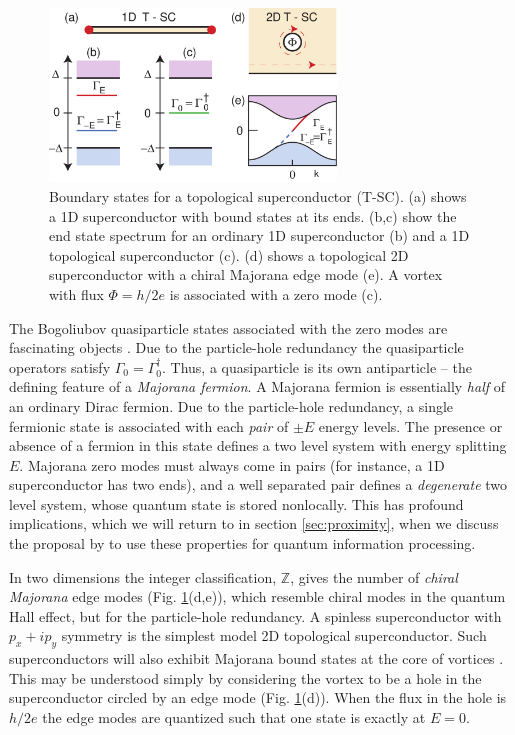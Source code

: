 \documentclass[twocolumn,floatfix,showpacs,rmp,aps]{revtex4}
\begin{document}
	\begin{figure}
		\includegraphics[width=3in]{Fig4}
		\caption{Boundary states for a topological superconductor (T-SC).  (a) shows a 1D superconductor
			with bound states at its ends.  (b,c) show the end state spectrum for an ordinary 1D superconductor
			(b) and a 1D topological superconductor (c).  (d) shows a topological 2D superconductor
			with a chiral Majorana edge mode (e).  A vortex with flux $\Phi = h/2e$ is associated
			with a zero mode (c).}
		\label{fig:scedge}
	\end{figure}
	
	The Bogoliubov quasiparticle states associated with the zero modes are
	fascinating objects \cite{nayak08,readgreen00,stern04,ivanov01,kitaev00}.  Due to the particle-hole redundancy
	the quasiparticle operators satisfy $\Gamma_0 = \Gamma_0^\dagger$.
	Thus, a quasiparticle is its own antiparticle -- the defining
	feature of a {\it Majorana fermion}.
	A Majorana fermion is essentially {\it half} of an ordinary
	Dirac fermion.  Due to the particle-hole redundancy, a single fermionic state
	is associated with each {\it pair} of $\pm E$ energy levels.  The presence or absence
	of a fermion in this state defines a two level system with energy splitting $E$.
	Majorana zero modes
	must always come in pairs (for instance, a 1D superconductor has two ends), and a
	well separated pair
	defines a {\it degenerate} two level system, whose quantum state is stored nonlocally.
	This has profound implications, which we will return to in section
	\ref{sec:proximity}, when we discuss the proposal by \textcite{kitaev03} to use these
	properties for quantum information processing.
	
	In two dimensions the integer classification, $\mathbb{Z}$,
	gives the number of {\it chiral Majorana} edge
	modes (Fig. \ref{fig:scedge}(d,e)), which resemble chiral modes in the quantum Hall effect, but for
	the particle-hole redundancy.  A spinless superconductor with $p_x+ip_y$ symmetry
	is the simplest model 2D topological superconductor.
	Such superconductors will also exhibit Majorana bound states at the core of vortices
	\cite{caroli64,volovik99,readgreen00}.
	This may be understood simply by considering the vortex to be a hole
	in the superconductor circled by an edge mode (Fig. \ref{fig:scedge}(d)).
	When the flux in the
	hole is $h/2e$ the edge modes are quantized such that one state is exactly
	at $E=0$.
	
\end{document}
